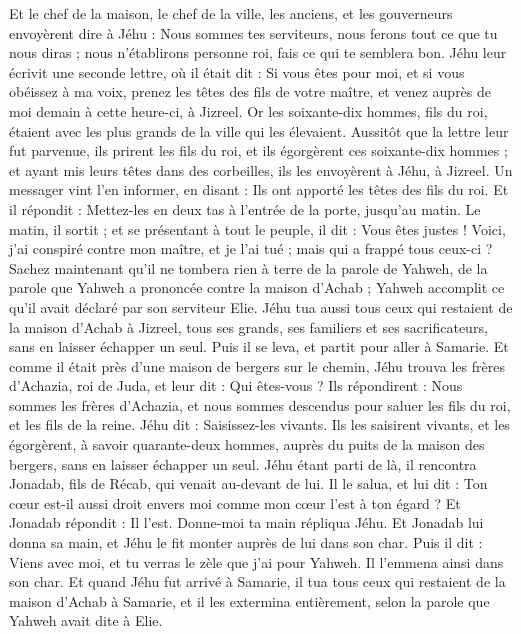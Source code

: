 \begin{multicols}{2}
Et le chef de la maison, le chef de la ville, les anciens, et les gouverneurs envoyèrent dire à Jéhu : Nous sommes tes serviteurs, nous ferons tout ce que tu nous diras ; nous n’établirons personne roi, fais ce qui te semblera bon.
Jéhu leur écrivit une seconde lettre, où il était dit : Si vous êtes pour moi, et si vous obéissez à ma voix, prenez les têtes des fils de votre maître, et venez auprès de moi demain à cette heure-ci, à Jizreel. Or les soixante-dix hommes, fils du roi, étaient avec les plus grands de la ville qui les élevaient.
Aussitôt que la lettre leur fut parvenue, ils prirent les fils du roi, et ils égorgèrent ces soixante-dix hommes ; et ayant mis leurs têtes dans des corbeilles, ils les envoyèrent à Jéhu, à Jizreel.
Un messager vint l’en informer, en disant : Ils ont apporté les têtes des fils du roi. Et il répondit : Mettez-les en deux tas à l’entrée de la porte, jusqu’au matin.
Le matin, il sortit ; et se présentant à tout le peuple, il dit : Vous êtes justes ! Voici, j’ai conspiré contre mon maître, et je l’ai tué ; mais qui a frappé tous ceux-ci ?
Sachez maintenant qu’il ne tombera rien à terre de la parole de Yahweh, de la parole que Yahweh a prononcée contre la maison d’Achab ; Yahweh accomplit ce qu’il avait déclaré par son serviteur Elie.
Jéhu tua aussi tous ceux qui restaient de la maison d’Achab à Jizreel, tous ses grands, ses familiers et ses sacrificateurs, sans en laisser échapper un seul.
Puis il se leva, et partit pour aller à Samarie. Et comme il était près d’une maison de bergers sur le chemin,
Jéhu trouva les frères d’Achazia, roi de Juda, et leur dit : Qui êtes-vous ? Ils répondirent : Nous sommes les frères d’Achazia, et nous sommes descendus pour saluer les fils du roi, et les fils de la reine.
Jéhu dit : Saisissez-les vivants. Ils les saisirent vivants, et les égorgèrent, à savoir quarante-deux hommes, auprès du puits de la maison des bergers, sans en laisser échapper un seul.
Jéhu étant parti de là, il rencontra Jonadab, fils de Récab, qui venait au-devant de lui. Il le salua, et lui dit : Ton cœur est-il aussi droit envers moi comme mon cœur l’est à ton égard ? Et Jonadab répondit : Il l’est. Donne-moi ta main répliqua Jéhu. Et Jonadab lui donna sa main, et Jéhu le fit monter auprès de lui dans son char.
Puis il dit : Viens avec moi, et tu verras le zèle que j’ai pour Yahweh. Il l’emmena ainsi dans son char.
Et quand Jéhu fut arrivé à Samarie, il tua tous ceux qui restaient de la maison d’Achab à Samarie, et il les extermina entièrement, selon la parole que Yahweh avait dite à Elie.

\end{multicols}
